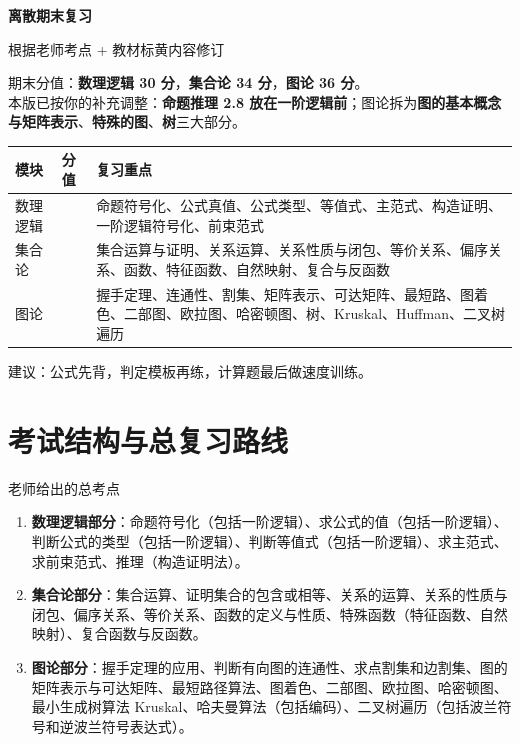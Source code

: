 \documentclass[UTF8,zihao=-4]{ctexart}
\newcommand{\kw}[1]{\textbf{\color{main}#1}}
\begin{document}
\begin{titlepage}
\centering
\vspace*{1.1cm}
{\bfseries 离散期末复习\par}
\vspace{0.35cm}
{\color{main} 根据老师考点 + 教材标黄内容修订\par}
\vspace{0.9cm}
\begin{tcolorbox}[enhanced,colback=softblue,colframe=main,width=0.86\textwidth,arc=2mm,boxrule=0.9pt]
\centering
\large
期末分值：\kw{数理逻辑 30 分}，\kw{集合论 34 分}，\kw{图论 36 分}。\\[0.35em]
本版已按你的补充调整：\kw{命题推理 2.8 放在一阶逻辑前}；图论拆为\kw{图的基本概念与矩阵表示}、\kw{特殊的图}、\kw{树}三大部分。
\end{tcolorbox}
\vspace{0.8cm}
\begin{tabular}{>{\centering\arraybackslash}p{3.3cm}>{\centering\arraybackslash}p{2.4cm}p{8.2cm}}
\toprule
模块 & 分值 & 复习重点 \\
\midrule
数理逻辑 & 30 & 命题符号化、公式真值、公式类型、等值式、主范式、构造证明、一阶逻辑符号化、前束范式 \\
集合论 & 34 & 集合运算与证明、关系运算、关系性质与闭包、等价关系、偏序关系、函数、特征函数、自然映射、复合与反函数 \\
图论 & 36 & 握手定理、连通性、割集、矩阵表示、可达矩阵、最短路、图着色、二部图、欧拉图、哈密顿图、树、Kruskal、Huffman、二叉树遍历 \\
\bottomrule
\end{tabular}
\vfill
{\large 建议：公式先背，判定模板再练，计算题最后做速度训练。}
\end{titlepage}

\tableofcontents
\newpage

\section{考试结构与总复习路线}

\begin{corebox}{老师给出的总考点}
\begin{enumerate}
  \item \kw{数理逻辑部分}：命题符号化（包括一阶逻辑）、求公式的值（包括一阶逻辑）、判断公式的类型（包括一阶逻辑）、判断等值式（包括一阶逻辑）、求主范式、求前束范式、推理（构造证明法）。
  \item \kw{集合论部分}：集合运算、证明集合的包含或相等、关系的运算、关系的性质与闭包、偏序关系、等价关系、函数的定义与性质、特殊函数（特征函数、自然映射）、复合函数与反函数。
  \item \kw{图论部分}：握手定理的应用、判断有向图的连通性、求点割集和边割集、图的矩阵表示与可达矩阵、最短路径算法、图着色、二部图、欧拉图、哈密顿图、最小生成树算法 Kruskal、哈夫曼算法（包括编码）、二叉树遍历（包括波兰符号和逆波兰符号表达式）。
\end{enumerate}
\end{corebox}
\end{document}
